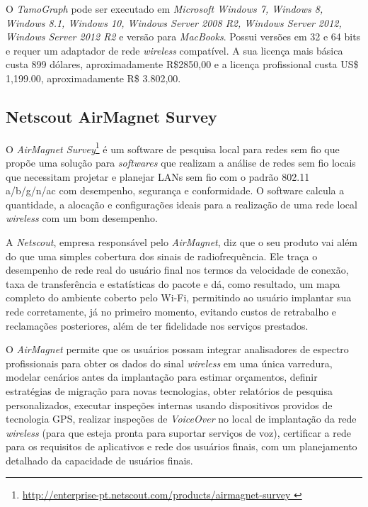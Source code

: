 \documentclass[
	12pt,				%
	openright,			%
	twoside,			%
	a4paper,			%
	english,			%
	french,				%
	spanish,			%
	brazil				%
	]{abntex2}
\begin{document}
O \textit{TamoGraph} pode ser executado em \textit{Microsoft Windows 7, Windows 8, Windows 8.1, Windows 10, Windows Server 2008 R2, Windows Server 2012, Windows Server 2012 R2} e versão para \textit{MacBooks}. Possui versões em 32 e 64 bits e requer um adaptador de rede \textit{wireless} compatível. A sua licença mais básica custa 899 dólares, aproximadamente R\$2850,00 e a licença profissional custa US\$ 1,199.00, aproximadamente R\$ 3.802,00.


\subsection[Netscout AirMagnet Survey]{Netscout AirMagnet Survey}

O \textit{AirMagnet Survey}\footnote{\url{http://enterprise-pt.netscout.com/products/airmagnet-survey }} é um software de pesquisa local para redes sem fio que propõe uma solução para \textit{softwares} que realizam a análise de redes sem fio locais que necessitam projetar e planejar LANs sem fio com o padrão 802.11  a/b/g/n/ac com desempenho, segurança e conformidade. O software calcula a quantidade, a alocação e configurações ideais para a realização de uma rede local \textit{wireless} com um bom desempenho.

A \textit{Netscout}, empresa responsável pelo \textit{AirMagnet}, diz que o seu produto vai além do que uma simples cobertura dos sinais de radiofrequência. Ele traça o desempenho de rede real do usuário final nos termos da velocidade de conexão, taxa de transferência e estatísticas do pacote e dá, como resultado, um mapa completo do ambiente coberto pelo Wi-Fi, permitindo ao usuário implantar sua rede corretamente, já no primeiro momento, evitando custos de retrabalho e reclamações posteriores, além de ter fidelidade nos serviços prestados.

O \textit{AirMagnet} permite que os usuários possam integrar analisadores de espectro profissionais para obter os dados do sinal \textit{wireless} em uma única varredura, modelar cenários antes da implantação para estimar orçamentos, definir estratégias de migração para novas tecnologias, obter relatórios de pesquisa personalizados, executar inspeções internas usando dispositivos providos de tecnologia GPS, realizar inspeções de \textit{VoiceOver} no local de implantação da rede \textit{wireless} (para que esteja pronta para suportar serviços de voz), certificar a rede para os requisitos de aplicativos e rede dos usuários finais, com um planejamento detalhado da capacidade de usuários finais.
\end{document}
